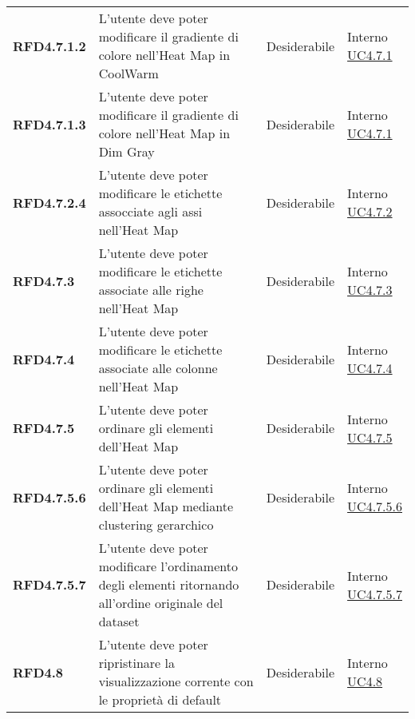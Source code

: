 \begin{longtable}[H]{| >{\raggedright\bfseries}m{20mm} | >{\raggedright}m{90mm} | >{\centering}m{25mm} | >{\centering\arraybackslash}m{30mm}|}
    RFD4.7.1.2
    & L'utente deve poter modificare il gradiente di colore nell'Heat Map in CoolWarm
    & Desiderabile
    & \makecell{ Interno \\  \hyperref[par:uc4.7.1]{UC4.7.1} }\\

    RFD4.7.1.3
    & L'utente deve poter modificare il gradiente di colore nell'Heat Map in Dim Gray
    & Desiderabile
    & \makecell{ Interno \\  \hyperref[par:uc4.7.1]{UC4.7.1} }\\

    RFD4.7.2.4
    & L'utente deve poter modificare le etichette assocciate agli assi nell'Heat Map
    & Desiderabile
    & \makecell{ Interno \\  \hyperref[par:uc4.7.2]{UC4.7.2} }\\

    RFD4.7.3
    & L'utente deve poter modificare le etichette associate alle righe nell'Heat Map
    & Desiderabile
    & \makecell{ Interno \\  \hyperref[par:uc4.7.3]{UC4.7.3} }\\

    RFD4.7.4
    & L'utente deve poter modificare le etichette associate alle colonne nell'Heat Map
    & Desiderabile
    & \makecell{ Interno \\  \hyperref[par:uc4.7.4]{UC4.7.4} }\\

    RFD4.7.5
    & L'utente deve poter ordinare gli elementi dell'Heat Map
    & Desiderabile
    & \makecell{ Interno \\  \hyperref[par:uc4.7.5]{UC4.7.5} }\\

    RFD4.7.5.6
    & L'utente deve poter ordinare gli elementi dell'Heat Map mediante clustering gerarchico
    & Desiderabile
    & \makecell{ Interno \\  \hyperref[spar:uc4.7.5.6]{UC4.7.5.6} }\\

    RFD4.7.5.7
    & L'utente deve poter modificare l'ordinamento degli elementi ritornando all'ordine originale del dataset
    & Desiderabile
    & \makecell{ Interno \\  \hyperref[spar:uc4.7.5.7]{UC4.7.5.7} }\\

    RFD4.8
    & L'utente deve poter ripristinare la visualizzazione corrente con le proprietà di default
    & Desiderabile
    & \makecell{ Interno \\  \hyperref[ssub:uc4.8]{UC4.8} }\\


\end{longtable}

